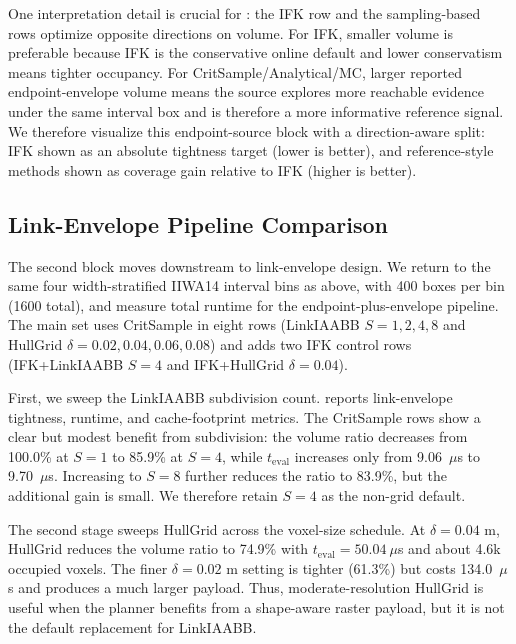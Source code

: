 \documentclass[journal]{IEEEtran}
\begin{document}
One interpretation detail is crucial for : the IFK
row and the sampling-based rows optimize opposite directions on volume. For
IFK, smaller volume is preferable because IFK is the conservative online default
and lower conservatism means tighter occupancy. For
CritSample/Analytical/MC, larger reported endpoint-envelope volume means the
source explores more reachable evidence under the same interval box and is
therefore a more informative reference signal. We therefore visualize this endpoint-source block with a
direction-aware split: IFK shown as an absolute tightness target (lower is
better), and reference-style methods shown as coverage gain relative to IFK
(higher is better).



\subsection{Link-Envelope Pipeline Comparison}\label{sec:exp_linkenv}



The second block moves downstream to link-envelope design. We return to the
same four width-stratified IIWA14 interval bins as above, with 400 boxes per
bin (1600 total), and measure total runtime for the endpoint-plus-envelope
pipeline. The main set uses CritSample in eight rows (LinkIAABB
$S=1,2,4,8$ and HullGrid $\delta=0.02,0.04,0.06,0.08$) and adds two IFK
control rows (IFK+LinkIAABB $S=4$ and IFK+HullGrid $\delta=0.04$).

First, we sweep the LinkIAABB subdivision count.
 reports link-envelope tightness, runtime,
and cache-footprint metrics. The CritSample rows show a clear but modest
benefit from subdivision: the volume ratio decreases from 100.0\% at $S=1$ to
85.9\% at $S=4$, while $t_{\mathrm{eval}}$ increases only from
9.06~$\mu$s to 9.70~$\mu$s. Increasing to $S=8$ further reduces the ratio to
83.9\%, but the additional gain is small. We therefore retain $S=4$ as the
non-grid default.

The second stage sweeps HullGrid across the voxel-size schedule. At
$\delta=0.04$ m, HullGrid reduces the volume ratio to 74.9\% with
$t_{\mathrm{eval}}=50.04~\mu$s and about 4.6k occupied voxels. The finer
$\delta=0.02$ m setting is tighter (61.3\%) but costs
134.0~$\mu$s and produces a much larger payload. Thus, moderate-resolution
HullGrid is useful when the planner benefits from a shape-aware raster payload,
but it is not the default replacement for LinkIAABB.
\end{document}
